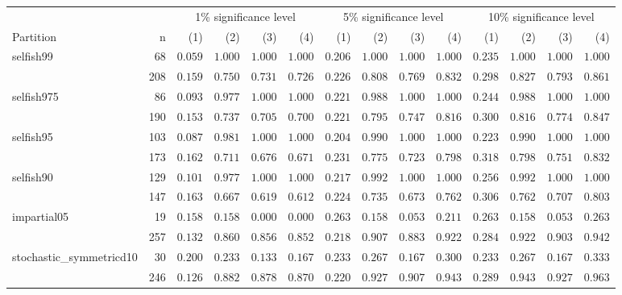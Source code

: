 \begin{longtable}{lrrrrrrrrrrrrr}
\toprule
 &  & \multicolumn{4}{c}{1\% significance level} & \multicolumn{4}{c}{5\% significance level} & \multicolumn{4}{c}{10\% significance level} \\ 
\cmidrule(lr){3-6} \cmidrule(lr){7-10} \cmidrule(lr){11-14}
Partition & n & (1) & (2) & (3) & (4) & (1) & (2) & (3) & (4) & (1) & (2) & (3) & (4) \\ 
\midrule\addlinespace[2.5pt]
selfish99 & 68 & \textbf{$0.059$} & $1.000$ & $1.000$ & $1.000$ & \textbf{$0.206$} & $1.000$ & $1.000$ & $1.000$ & \textbf{$0.235$} & $1.000$ & $1.000$ & $1.000$ \\ 
 & 208 & $0.159$ & $0.750$ & $0.731$ & $0.726$ & $0.226$ & $0.808$ & $0.769$ & $0.832$ & $0.298$ & $0.827$ & $0.793$ & $0.861$ \\ 
selfish975 & 86 & \textbf{$0.093$} & $0.977$ & $1.000$ & $1.000$ & \textbf{$0.221$} & $0.988$ & $1.000$ & $1.000$ & \textbf{$0.244$} & $0.988$ & $1.000$ & $1.000$ \\ 
 & 190 & $0.153$ & $0.737$ & $0.705$ & $0.700$ & $0.221$ & $0.795$ & $0.747$ & $0.816$ & $0.300$ & $0.816$ & $0.774$ & $0.847$ \\ 
selfish95 & 103 & \textbf{$0.087$} & $0.981$ & $1.000$ & $1.000$ & \textbf{$0.204$} & $0.990$ & $1.000$ & $1.000$ & \textbf{$0.223$} & $0.990$ & $1.000$ & $1.000$ \\ 
 & 173 & $0.162$ & $0.711$ & $0.676$ & $0.671$ & $0.231$ & $0.775$ & $0.723$ & $0.798$ & $0.318$ & $0.798$ & $0.751$ & $0.832$ \\ 
selfish90 & 129 & \textbf{$0.101$} & $0.977$ & $1.000$ & $1.000$ & \textbf{$0.217$} & $0.992$ & $1.000$ & $1.000$ & \textbf{$0.256$} & $0.992$ & $1.000$ & $1.000$ \\ 
 & 147 & $0.163$ & $0.667$ & $0.619$ & $0.612$ & $0.224$ & $0.735$ & $0.673$ & $0.762$ & $0.306$ & $0.762$ & $0.707$ & $0.803$ \\ 
impartial05 & 19 & $0.158$ & \textbf{$0.158$} & $0.000$ & $0.000$ & $0.263$ & \textbf{$0.158$} & $0.053$ & $0.211$ & $0.263$ & \textbf{$0.158$} & $0.053$ & $0.263$ \\ 
 & 257 & $0.132$ & $0.860$ & $0.856$ & $0.852$ & $0.218$ & $0.907$ & $0.883$ & $0.922$ & $0.284$ & $0.922$ & $0.903$ & $0.942$ \\ 
stochastic\_symmetricd10 & 30 & $0.200$ & \textbf{$0.233$} & $0.133$ & $0.167$ & $0.233$ & \textbf{$0.267$} & $0.167$ & $0.300$ & $0.233$ & \textbf{$0.267$} & $0.167$ & $0.333$ \\ 
 & 246 & $0.126$ & $0.882$ & $0.878$ & $0.870$ & $0.220$ & $0.927$ & $0.907$ & $0.943$ & $0.289$ & $0.943$ & $0.927$ & $0.963$ \\ 

\end{longtable}
